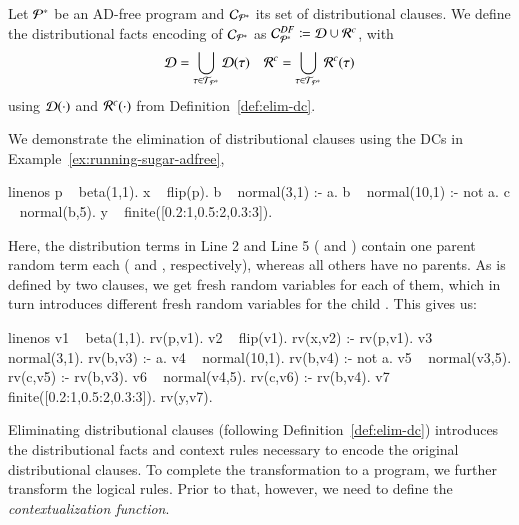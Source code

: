 \begin{definition}
	\label{def:core_encoding}
	Let ${{\mathcal{P}}^{*}}$ be an AD-free \dcproblogsty program and $\mathcal{C}_{{{\mathcal{P}}^{*}}}$ its set of distributional clauses. We define the distributional facts encoding of $\mathcal{C}_{{{\mathcal{P}}^{*}}}$  as
	$\mathcal{C}_{{{\mathcal{P}}^{*}}}^{DF}\coloneqq \mathcal{D}\cup {\mathcal{R}}^{c}$, with
	\begin{align*}
		\mathcal{D} = \bigcup_{\tau\in \mathcal{T}_{{{\mathcal{P}}^{*}}}}\mathcal{D}(\tau)
		 &  &
		{\mathcal{R}}^{c} = \bigcup_{\tau\in \mathcal{T}_{{{\mathcal{P}}^{*}}}} {\mathcal{R}}^{c}(\tau)
	\end{align*}
	using $\mathcal{D}(\cdot)$ and ${\mathcal{R}}^{c}(\cdot)$ from Definition~\ref{def:elim-dc}.
\end{definition}



\begin{example}
	\label{ex:running-sugar-core-encoding}
	We demonstrate the elimination of distributional clauses using the DCs in Example~\ref{ex:running-sugar-adfree}, \ie
	\begin{problog*}{linenos}
p ~ beta(1,1).
x ~ flip(p).
b ~ normal(3,1) :- a.
b ~ normal(10,1) :- not a.
c ~ normal(b,5).
y ~ finite([0.2:1,0.5:2,0.3:3]).
	\end{problog*}
	Here,  the distribution terms in Line 2 and Line 5 ( and ) contain one parent random term each ( and , respectively), whereas all others have no parents. As  is defined by two clauses, we get fresh random variables for each of them, which in turn  introduces different fresh random variables for the child .
	This gives us:
	\begin{problog*}{linenos}
v1 ~ beta(1,1).
rv(p,v1).
v2 ~ flip(v1).
rv(x,v2) :- rv(p,v1).
v3 ~ normal(3,1).
rv(b,v3) :- a.
v4 ~ normal(10,1).
rv(b,v4) :- not a.
v5 ~ normal(v3,5).
rv(c,v5) :- rv(b,v3).
v6 ~ normal(v4,5).
rv(c,v6) :- rv(b,v4).
v7 ~ finite([0.2:1,0.5:2,0.3:3]).
rv(y,v7).
	\end{problog*}
\end{example}







Eliminating distributional clauses (following Definition~\ref{def:elim-dc}) introduces the distributional facts and context rules necessary to encode the original distributional clauses. To complete the transformation to a \dfplpsty program, we further transform the logical rules. Prior to that, however, we need to define the {\em contextualization function}.

